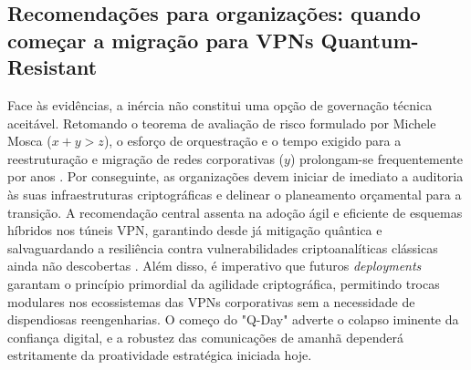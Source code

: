 \documentclass[runningheads]{llncs}
\begin{document}
\subsection{Recomendações para organizações: quando começar a migração para VPNs Quantum-Resistant}
Face às evidências, a inércia não constitui uma opção de governação técnica aceitável. Retomando o teorema de avaliação de risco formulado por Michele Mosca ($x + y > z$), o esforço de orquestração e o tempo exigido para a reestruturação e migração de redes corporativas ($y$) prolongam-se frequentemente por anos \cite{article}. Por conseguinte, as organizações devem iniciar de imediato a auditoria às suas infraestruturas criptográficas e delinear o planeamento orçamental para a transição. A recomendação central assenta na adoção ágil e eficiente de esquemas híbridos nos túneis VPN, garantindo desde já mitigação quântica e salvaguardando a resiliência contra vulnerabilidades criptoanalíticas clássicas ainda não descobertas \cite{oterogarcia2025introducingpostquantumalgorithmsopen,mallick2026studypostquantumstatus}. Além disso, é imperativo que futuros \textit{deployments} garantam o princípio primordial da agilidade criptográfica, permitindo trocas modulares nos ecossistemas das VPNs corporativas sem a necessidade de dispendiosas reengenharias. O começo do "Q-Day" adverte o colapso iminente da confiança digital, e a robustez das comunicações de amanhã dependerá estritamente da proatividade estratégica iniciada hoje.

\newpage



\end{document}
